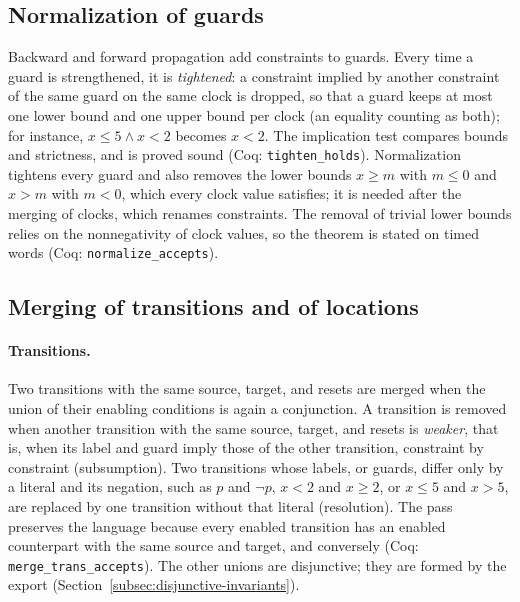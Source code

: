 \subsection{Normalization of guards}
\label{sec:normalize}
Backward and forward propagation add constraints to guards.  Every time a
guard is strengthened, it is \emph{tightened}: a constraint implied by another
constraint of the same guard on the same clock is dropped, so that a guard
keeps at most one lower bound and one upper bound per clock (an equality
counting as both); for instance, $x\le5\land x<2$ becomes $x<2$.  The
implication test compares bounds and strictness, and is proved sound (Coq:
\texttt{tighten\_\allowbreak{}holds}).  Normalization tightens every guard and also
removes the lower bounds $x\ge m$ with $m\le0$ and $x>m$ with $m<0$, which every
clock value satisfies; it is needed after the merging of clocks, which renames
constraints.  The removal of trivial lower bounds relies on the nonnegativity
of clock values, so the theorem is stated on timed words (Coq:
\texttt{normalize\_\allowbreak{}accepts}).

\subsection{Merging of transitions and of locations}
\label{sec:merge-ts}\label{sec:main-merge-ts}
\paragraph{Transitions.}
Two transitions with the same source, target, and resets are merged when the
union of their enabling conditions is again a conjunction.  A transition is
removed when another transition with the same source, target, and resets is
\emph{weaker}, that is, when its label and guard imply those of the other
transition, constraint by constraint (subsumption).  Two transitions
whose labels, or guards, differ only by a literal and its negation, such as
$p$ and $\neg p$, $x<2$ and $x\ge2$, or $x\le5$ and $x>5$, are replaced by one
transition without that literal (resolution).  The pass preserves the language
because every enabled transition has an enabled counterpart with the same
source and target, and conversely (Coq: \texttt{merge\_\allowbreak{}trans\_\allowbreak{}accepts}).
The other unions are disjunctive; they are formed by the export
(Section~\ref{subsec:disjunctive-invariants}).

